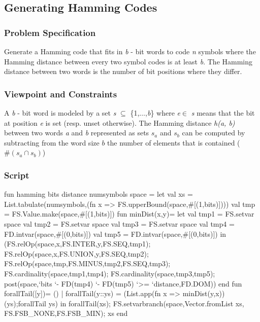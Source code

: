 \documentclass[a4paper,halfparskip]{scrartcl}
\begin{document}
\newpage
\subsection{Generating Hamming Codes}

\subsubsection{Problem Specification}
Generate a Hamming code that fits in \emph{b} - bit words to 
code \emph{n} symbols where the Hamming distance between every 
two symbol codes is at least \emph{b}. The Hamming distance between 
two words is the number of bit positions where they differ. 

\subsubsection{Viewpoint and Constraints}
A \emph{b} - bit word is modeled by a set 
\emph{s} $\subseteq$ \{1,$\ldots$,\emph{b}\}
where \emph{e}$\in$ \emph{s} means that the bit
at position \emph{e} is set (resp. unset otherwise). The Hamming 
distance \emph{h(a, b)} between two words \emph{a} and \emph{b}
represented as sets $s_a$  and $s_b$ 
can be computed by subtracting from the word size $b$ 
the number of elements that is contained 
($\#(s_a \cap s_b)$) 

\subsubsection{Script}
\begin{myverbatim}

 
fun hamming bits distance numsymbols space =
    let
       val xs = List.tabulate(numsymbols,(fn x => 
                    FS.upperBound(space,#[(1,bits)])))
       val tmp = FS.Value.make(space,#[(1,bits)])
       fun minDist(x,y)= 
           let
              val tmp1 = FS.setvar space
              val tmp2 = FS.setvar space
              val tmp3 = FS.setvar space
              val tmp4 = FD.intvar(space,#[(0,bits)])
              val tmp5 = FD.intvar(space,#[(0,bits)])
           in
             (FS.relOp(space,x,FS.INTER,y,FS.SEQ,tmp1);
              FS.relOp(space,x,FS.UNION,y,FS.SEQ,tmp2);
              FS.relOp(space,tmp,FS.MINUS,tmp2,FS.SEQ,tmp3);
              FS.cardinality(space,tmp1,tmp4);
              FS.cardinality(space,tmp3,tmp5);
              post(space,`bits `- FD(tmp4) `- FD(tmp5) 
                         `>= `distance,FD.DOM))
           end 
       fun forallTail([y])= ()
         | forallTail(y::ys) = (List.app(fn x => 
                          minDist(y,x))(ys);forallTail ys)
    in
       forallTail(xs);
       FS.setvarbranch(space,Vector.fromList xs,
                             FS.FSB_NONE,FS.FSB_MIN);
       xs
    end
\end{myverbatim}
\end{document}
